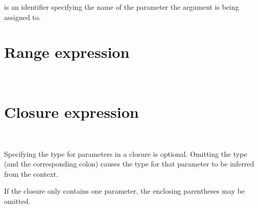  is an identifier specifying the name of the
parameter the argument  is being assigned to.

\section{Range expression}

\begin{grammar}
 \textrightarrow{}   \\
 \textrightarrow{}   
\end{grammar}

\section{Closure expression}

\begin{grammar}
 \textrightarrow{} \code{(}  \code{)} \code{->} \\
 \textrightarrow{} \code{(}  \code{)} \code{->} 
\end{grammar}

Specifying the type for parameters in a closure  is
optional. Omitting the type (and the corresponding colon) causes the type for
that parameter to be inferred from the context.

If the closure  only contains one parameter, the
enclosing parentheses may be omitted.
